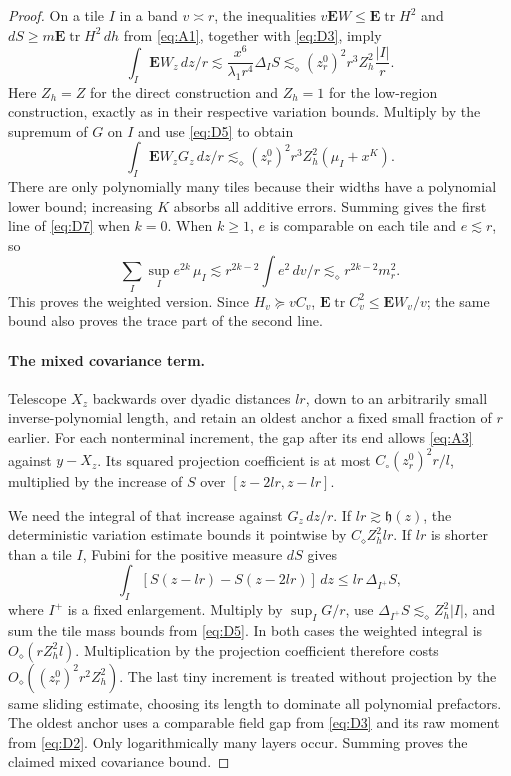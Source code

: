 \begin{proof}
On a tile $I$ in a band $v\asymp r$, the inequalities
$v\mathbf EW\le\mathbf E\operatorname{tr}H^2$ and
$dS\ge m\mathbf E\operatorname{tr}H^2\,dh$ from \eqref{eq:A1},
together with \eqref{eq:D3}, imply
\[
 \int_I\mathbf EW_z\,dz/r
 \lesssim \frac{x^6}{\lambda_1r^4}\Delta_I S
 \lesssim_\diamond (z_r^0)^2r^3Z_h^2\frac{|I|}{r}.
\]
Here $Z_h=Z$ for the direct construction and $Z_h=1$ for the low-region
construction, exactly as in their respective variation bounds.
Multiply by the supremum of $G$ on $I$ and use \eqref{eq:D5} to obtain
\begin{equation*}
 \int_I\mathbf EW_zG_z\,dz/r
 \lesssim_\diamond (z_r^0)^2r^3Z_h^2(\mu_I+x^K).
\end{equation*}
There are only polynomially many tiles because their widths have a
polynomial lower bound; increasing $K$ absorbs all additive errors.
Summing gives the first line of \eqref{eq:D7} when $k=0$.  When
$k\ge1$, $e$ is comparable on each tile and $e\lesssim r$, so
\[
 \sum_I\sup_I e^{2k}\,\mu_I
 \lesssim r^{2k-2}\int e^2\,dv/r
 \lesssim_\diamond r^{2k-2}m_r^2.
\]
This proves the weighted version.  Since $H_v\succeq vC_v$,
$\mathbf E\operatorname{tr}C_v^2\le\mathbf EW_v/v$; the same bound
also proves the trace part of the second line.

\paragraph{The mixed covariance term.}
Telescope $X_z$ backwards over dyadic distances $lr$, down
to an arbitrarily small inverse-polynomial length, and retain an oldest
anchor a fixed small fraction of $r$ earlier.  For each nonterminal
increment, the gap after its end allows \eqref{eq:A3} against
$y-X_z$.  Its squared projection coefficient is at most
$C_\circ(z_r^0)^2r/l$, multiplied by the increase of $S$ over
$[z-2lr,z-lr]$.

We need the integral of that increase against $G_z\,dz/r$.
If $lr\gtrsim\mathfrak h(z)$, the deterministic variation estimate
bounds it pointwise by $C_\diamond Z_h^2lr$.  If $lr$ is shorter
than a tile $I$, Fubini for the positive measure $dS$ gives
\[
 \int_I[S(z-lr)-S(z-2lr)]\,dz
       \le lr\,\Delta_{I^+}S,
\]
where $I^+$ is a fixed enlargement.  Multiply by $\sup_I G/r$,
use $\Delta_{I^+}S\lesssim_\diamond Z_h^2|I|$, and sum the tile
mass bounds from \eqref{eq:D5}.  In both cases the weighted integral
is $O_\diamond(rZ_h^2l)$.  Multiplication by the projection
coefficient therefore costs $O_\diamond((z_r^0)^2r^2Z_h^2)$.
The last tiny increment is treated without projection by the same
sliding estimate, choosing its length to dominate all polynomial
prefactors.  The oldest anchor uses a comparable field gap from
\eqref{eq:D3} and its raw moment from \eqref{eq:D2}.
Only logarithmically many layers occur.  Summing proves the claimed
mixed covariance bound.


\end{proof}
